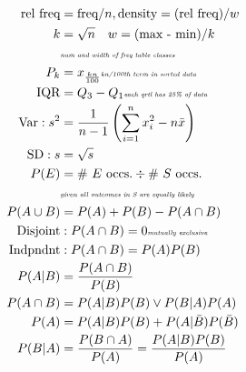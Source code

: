 \documentclass{article}
\newcommand{\note}[1]{\tiny\smash{\textit{#1}}}
\begin{document}
\scriptsize
\noindent


\begin{minipage}{0.1\textwidth}
	\begin{align*}
		\text{rel freq} &= \text{freq} / n, \text{density} = (\text{rel freq}) / w \\
		k &= \sqrt{n} \quad w = (\text{max - min}) / k \\
			&\note{num and width of freq table classes} \\
		P_k &= x_{\frac{kn}{100}} \note{kn/100th term in sorted data} \\
		\text{IQR} &= Q_3 - Q_1
			\note{each qrtl has 25\% of data} \\
		\text{Var}: s^2 &= \frac{1}{n-1} \left( \sum_{i=1}^n x_i^2 - n \bar x \right) \\
		\text{SD}: s &= \sqrt{s} \\
		P(E) &= \text{\# $E$ occs.} \div \text{\# $S$ occs.} \\
			&\note{given all outcomes in S are equally likely} \\
		P(A \cup B) &= P(A) + P(B) - P(A \cap B) \\
		\text{Disjoint}&: P(A \cap B) = 0
			\note{mutually exclusive} \\
		\text{Indpndnt}&: P(A \cap B) = P(A) P(B) \\
		P(A|B) &= \frac{P(A \cap B)}{P(B)} \\
		P(A \cap B) &= P(A|B)P(B) \lor P(B|A)P(A) \\
		P(A) &= P(A|B)P(B) + P(A|\bar B)P(\bar B) \\
		P(B|A) &= \frac{P(B \cap A)}{P(A)} = \frac{P(A|B)P(B)}{P(A)}
	\end{align*}
\end{minipage}
\end{document}
